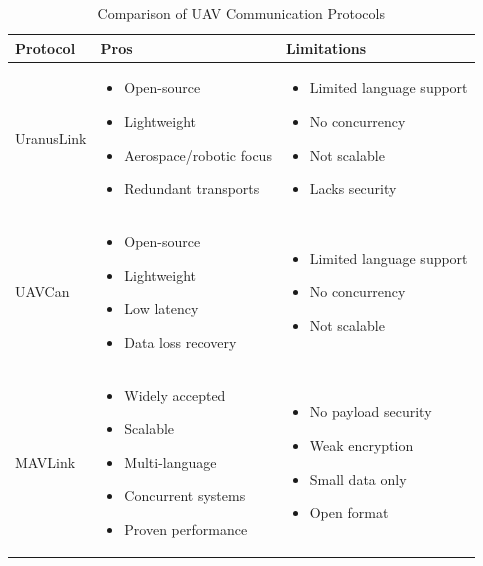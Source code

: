 \begin{table}[H]
\centering
\renewcommand{\arraystretch}{1.0} %
\begin{tabular}{|>{\centering\arraybackslash}m{3cm}|
                >{\arraybackslash}m{6cm}|
                >{\arraybackslash}m{6cm}|}
\hline
\textbf{Protocol} & \textbf{Pros} & \textbf{Limitations} \\ 
\hline
UranusLink & 
\begin{itemize}
    \item Open-source
    \item Lightweight
    \item Aerospace/robotic focus
    \item Redundant transports
\end{itemize} & 
\begin{itemize}
    \item Limited language support
    \item No concurrency
    \item Not scalable
    \item Lacks security
\end{itemize} \\ 
\hline
UAVCan & 
\begin{itemize}
    \item Open-source
    \item Lightweight
    \item Low latency
    \item Data loss recovery
\end{itemize} & 
\begin{itemize}
    \item Limited language support
    \item No concurrency
    \item Not scalable
\end{itemize} \\ 
\hline
MAVLink & 
\begin{itemize}
    \item Widely accepted
    \item Scalable
    \item Multi-language
    \item Concurrent systems
    \item Proven performance
\end{itemize} & 
\begin{itemize}
    \item No payload security
    \item Weak encryption
    \item Small data only
    \item Open format
\end{itemize} \\ 
\hline
\end{tabular}
\caption{Comparison of UAV Communication Protocols}
\label{tab:uav_protocol_comparison}
\end{table}





